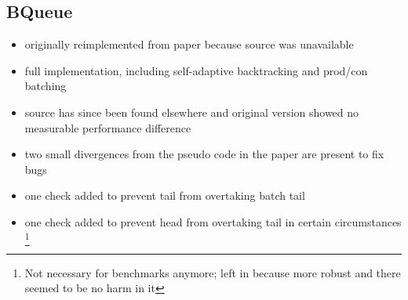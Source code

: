 


\subsection{BQueue}
\begin{itemize}
    \item originally reimplemented from paper because source was unavailable
    \item full implementation, including self-adaptive backtracking and prod/con batching
    \item source has since been found elsewhere and original version showed no measurable performance difference
    \item two small divergences from the pseudo code in the paper are present to fix bugs
    \item one check added to prevent tail from overtaking batch tail
    \item one check added to prevent head from overtaking tail in certain circumstances
        \footnote{Not necessary for benchmarks anymore; left in because more robust and there seemed to be no
        harm in it}
\end{itemize}

